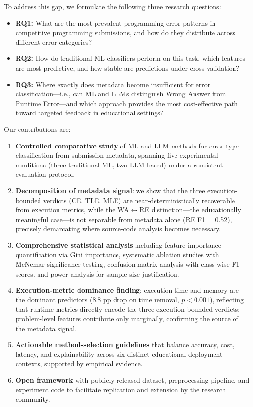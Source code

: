 \documentclass[acmsmall]{acmart}
\begin{document}
To address this gap, we formulate the following three research questions:

\begin{itemize}
    \item \textbf{RQ1:} What are the most prevalent programming error patterns
          in competitive programming submissions, and how do they distribute
          across different error categories?
    \item \textbf{RQ2:} How do traditional ML classifiers perform on this task,
          which features are most predictive, and how stable are predictions
          under cross-validation?
    \item \textbf{RQ3:} Where exactly does metadata become insufficient for
          error classification---i.e., can ML and LLMs distinguish Wrong Answer
          from Runtime Error---and which approach provides the most
          cost-effective path toward targeted feedback in educational settings?
\end{itemize}

Our contributions are:

\begin{enumerate}
    \item \textbf{Controlled comparative study} of ML and LLM methods for error
          type classification from submission metadata, spanning five
          experimental conditions (three traditional ML, two LLM-based) under a
          consistent evaluation protocol.
    \item \textbf{Decomposition of metadata signal}: we show that the three
          execution-bounded verdicts (CE, TLE, MLE) are near-deterministically
          recoverable from execution metrics, while the WA$\leftrightarrow$RE
          distinction---the educationally meaningful case---is not separable
          from metadata alone (RE F1 = 0.52), precisely demarcating where
          source-code analysis becomes necessary.
    \item \textbf{Comprehensive statistical analysis} including feature
          importance quantification via Gini importance, systematic ablation
          studies with McNemar significance testing, confusion matrix analysis
          with class-wise F1 scores, and power analysis for sample size
          justification.
    \item \textbf{Execution-metric dominance finding}: execution time and memory
          are the dominant predictors (8.8 pp drop on time removal, $p < 0.001$),
          reflecting that runtime metrics directly encode the three
          execution-bounded verdicts; problem-level features contribute only
          marginally, confirming the source of the metadata signal.
    \item \textbf{Actionable method-selection guidelines} that balance
          accuracy, cost, latency, and explainability across six distinct
          educational deployment contexts, supported by empirical evidence.
    \item \textbf{Open framework} with publicly released dataset, preprocessing
          pipeline, and experiment code to facilitate replication and
          extension by the research community.
\end{enumerate}
\end{document}
